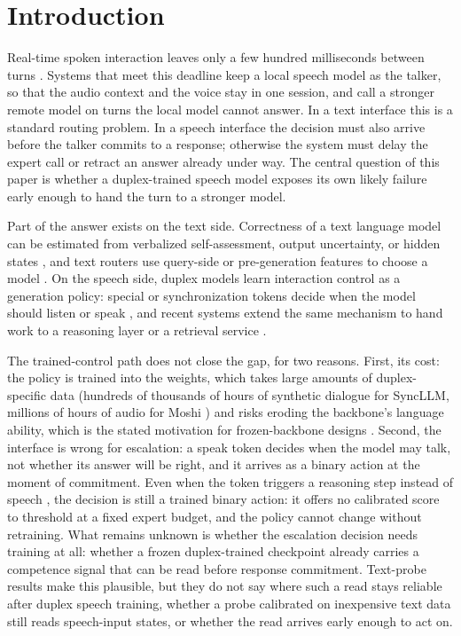 \section{Introduction}
\label{sec:intro}

Real-time spoken interaction leaves only a few hundred milliseconds
between turns \citep{stivers2009universals}. Systems that meet this
deadline keep a local speech model as the talker, so that the audio
context and the voice stay in one session, and call a stronger remote
model on turns the local model cannot answer. In a text interface this
is a standard routing problem. In a speech interface the decision must
also arrive before the talker commits to a response; otherwise the
system must delay the expert call or retract an answer already under
way. The central question of this paper is whether a duplex-trained
speech model exposes its own likely failure early enough to hand the
turn to a stronger model.

Part of the answer exists on the text side. Correctness of a text
language model can be estimated from verbalized self-assessment,
output uncertainty, or hidden states
\citep{kadavath2022language,azaria2023internal,burns2023discovering,
kossen2024semantic}, and text routers use query-side or
pre-generation features to choose a model
\citep{ong2024routellm,varshney2026llmrouter,lugoloobi2026failures}.
On the speech side, duplex models learn interaction control as a
generation policy: special or synchronization tokens decide when the
model should listen or speak
\citep{wang2024fsm,zhang2024duplex,veluri2024syncllm,fu2024vita,
yu2024salmonnomni}, and recent systems extend the same mechanism to
hand work to a reasoning layer or a retrieval service
\citep{huang2026duplexomni,chien2026moshirag}.

The trained-control path does not close the gap, for two reasons.
First, its cost: the policy is trained into the weights, which takes
large amounts of duplex-specific data (hundreds of thousands of hours
of synthetic dialogue for SyncLLM, millions of hours of audio for
Moshi \citep{veluri2024syncllm,defossez2024moshi}) and risks eroding
the backbone's language ability, which is the stated motivation for
frozen-backbone designs \citep{wang2024freezeomni,yu2024salmonnomni}.
Second, the interface is wrong for escalation: a speak token decides
when the model may talk, not whether its answer will be right, and it
arrives as a binary action at the moment of commitment. Even when the
token triggers a reasoning step instead of speech
\citep{huang2026duplexomni}, the decision is still a trained binary
action: it offers no calibrated score to threshold at a fixed expert
budget, and the policy cannot change without retraining. What remains unknown is whether the
escalation decision needs training at all: whether a frozen
duplex-trained checkpoint already carries a competence signal that can
be read before response commitment. Text-probe results make this
plausible, but they do not say where such a read stays reliable after
duplex speech training, whether a probe calibrated on inexpensive text
data still reads speech-input states, or whether the read arrives
early enough to act on.

